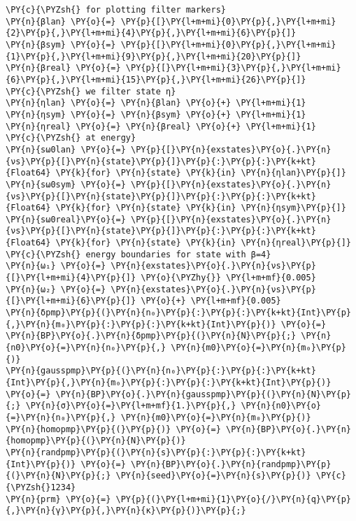\begin{Verbatim}[commandchars=\\\{\}]
\PY{c}{\PYZsh{} for plotting filter markers}
\PY{n}{βlan} \PY{o}{=} \PY{p}{[}\PY{l+m+mi}{0}\PY{p}{,}\PY{l+m+mi}{2}\PY{p}{,}\PY{l+m+mi}{4}\PY{p}{,}\PY{l+m+mi}{6}\PY{p}{]}
\PY{n}{βsym} \PY{o}{=} \PY{p}{[}\PY{l+m+mi}{0}\PY{p}{,}\PY{l+m+mi}{1}\PY{p}{,}\PY{l+m+mi}{9}\PY{p}{,}\PY{l+m+mi}{20}\PY{p}{]}
\PY{n}{βreal} \PY{o}{=} \PY{p}{[}\PY{l+m+mi}{3}\PY{p}{,}\PY{l+m+mi}{6}\PY{p}{,}\PY{l+m+mi}{15}\PY{p}{,}\PY{l+m+mi}{26}\PY{p}{]}
\PY{c}{\PYZsh{} we filter state η}
\PY{n}{ηlan} \PY{o}{=} \PY{n}{βlan} \PY{o}{+} \PY{l+m+mi}{1}
\PY{n}{ηsym} \PY{o}{=} \PY{n}{βsym} \PY{o}{+} \PY{l+m+mi}{1}
\PY{n}{ηreal} \PY{o}{=} \PY{n}{βreal} \PY{o}{+} \PY{l+m+mi}{1}
\PY{c}{\PYZsh{} at energy}
\PY{n}{sω0lan} \PY{o}{=} \PY{p}{[}\PY{n}{exstates}\PY{o}{.}\PY{n}{νs}\PY{p}{[}\PY{n}{state}\PY{p}{]}\PY{p}{:}\PY{p}{:}\PY{k+kt}{Float64} \PY{k}{for} \PY{n}{state} \PY{k}{in} \PY{n}{ηlan}\PY{p}{]}
\PY{n}{sω0sym} \PY{o}{=} \PY{p}{[}\PY{n}{exstates}\PY{o}{.}\PY{n}{νs}\PY{p}{[}\PY{n}{state}\PY{p}{]}\PY{p}{:}\PY{p}{:}\PY{k+kt}{Float64} \PY{k}{for} \PY{n}{state} \PY{k}{in} \PY{n}{ηsym}\PY{p}{]}
\PY{n}{sω0real}\PY{o}{=} \PY{p}{[}\PY{n}{exstates}\PY{o}{.}\PY{n}{νs}\PY{p}{[}\PY{n}{state}\PY{p}{]}\PY{p}{:}\PY{p}{:}\PY{k+kt}{Float64} \PY{k}{for} \PY{n}{state} \PY{k}{in} \PY{n}{ηreal}\PY{p}{]}
\PY{c}{\PYZsh{} energy boundaries for state with β=4}
\PY{n}{ω₁} \PY{o}{=} \PY{n}{exstates}\PY{o}{.}\PY{n}{νs}\PY{p}{[}\PY{l+m+mi}{4}\PY{p}{]} \PY{o}{\PYZhy{}} \PY{l+m+mf}{0.005}
\PY{n}{ω₂} \PY{o}{=} \PY{n}{exstates}\PY{o}{.}\PY{n}{νs}\PY{p}{[}\PY{l+m+mi}{6}\PY{p}{]} \PY{o}{+} \PY{l+m+mf}{0.005}
\PY{n}{δpmp}\PY{p}{(}\PY{n}{n₀}\PY{p}{:}\PY{p}{:}\PY{k+kt}{Int}\PY{p}{,}\PY{n}{m₀}\PY{p}{:}\PY{p}{:}\PY{k+kt}{Int}\PY{p}{)} \PY{o}{=} \PY{n}{BP}\PY{o}{.}\PY{n}{δpmp}\PY{p}{(}\PY{n}{N}\PY{p}{;} \PY{n}{n0}\PY{o}{=}\PY{n}{n₀}\PY{p}{,} \PY{n}{m0}\PY{o}{=}\PY{n}{m₀}\PY{p}{)}
\PY{n}{gausspmp}\PY{p}{(}\PY{n}{n₀}\PY{p}{:}\PY{p}{:}\PY{k+kt}{Int}\PY{p}{,}\PY{n}{m₀}\PY{p}{:}\PY{p}{:}\PY{k+kt}{Int}\PY{p}{)} \PY{o}{=} \PY{n}{BP}\PY{o}{.}\PY{n}{gausspmp}\PY{p}{(}\PY{n}{N}\PY{p}{;} \PY{n}{σ}\PY{o}{=}\PY{l+m+mf}{1.}\PY{p}{,} \PY{n}{n0}\PY{o}{=}\PY{n}{n₀}\PY{p}{,} \PY{n}{m0}\PY{o}{=}\PY{n}{m₀}\PY{p}{)}
\PY{n}{homopmp}\PY{p}{(}\PY{p}{)} \PY{o}{=} \PY{n}{BP}\PY{o}{.}\PY{n}{homopmp}\PY{p}{(}\PY{n}{N}\PY{p}{)}
\PY{n}{randpmp}\PY{p}{(}\PY{n}{s}\PY{p}{:}\PY{p}{:}\PY{k+kt}{Int}\PY{p}{)} \PY{o}{=} \PY{n}{BP}\PY{o}{.}\PY{n}{randpmp}\PY{p}{(}\PY{n}{N}\PY{p}{;} \PY{n}{seed}\PY{o}{=}\PY{n}{s}\PY{p}{)} \PY{c}{\PYZsh{}1234}
\PY{n}{prm} \PY{o}{=} \PY{p}{(}\PY{l+m+mi}{1}\PY{o}{/}\PY{n}{q}\PY{p}{,}\PY{n}{γ}\PY{p}{,}\PY{n}{κ}\PY{p}{)}\PY{p}{;}


\end{Verbatim}
